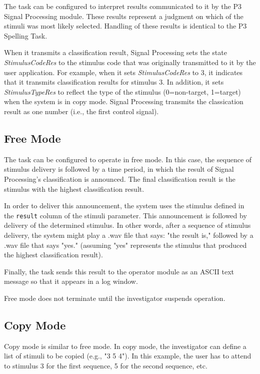 \documentclass[letterpaper,oneside,12pt]{article}
\begin{document}
The task can be configured to interpret results communicated to it by the P3 
Signal Processing module. These results represent a judgment on which of the 
stimuli was most likely selected. Handling of these results is identical to the 
P3 Spelling Task. 

When it transmits a classification result, Signal Processing sets the state 
\emph{StimulusCodeRes} to the stimulus code that was originally transmitted to 
it by the user application. For example, when it sets \emph{StimulusCodeRes} to 
3, it indicates that it transmits classification results for stimulus 3. In 
addition, it sets \emph{StimulusTypeRes} to reflect the type of the stimulus 
(0=non-target, 1=target) when the system is in copy mode. Signal Processing 
transmits the classication result as one number (i.e., the first control signal).

\subsection{Free Mode}

The task can be configured to operate in free mode. In this case, the sequence 
of stimulus delivery is followed by a time period, in which the result of Signal 
Processing's classification is announced. The final classification result is
the stimulus with the highest classification result.

In order to deliver this announcement, the system uses the stimulus defined in 
the \texttt{result} column of the stimuli parameter. This announcement is 
followed by delivery of the determined stimulus. In other words, after a 
sequence of stimulus delivery, the system might play a .wav file that says: "the 
result is," followed by a .wav file that says "yes." (assuming "yes" represents
the stimulus that produced the highest classification result).

Finally, the task sends this result to the operator module as an ASCII text 
message so that it appears in a log window.

Free mode does not terminate until the investigator suspends operation.


\subsection{Copy Mode}

Copy mode is similar to free mode. In copy mode, the investigator can define a 
list of stimuli to be copied (e.g., "3 5 4"). In this example, the user has to 
attend to stimulus 3 for the first sequence, 5 for the second sequence, etc.
\end{document}
